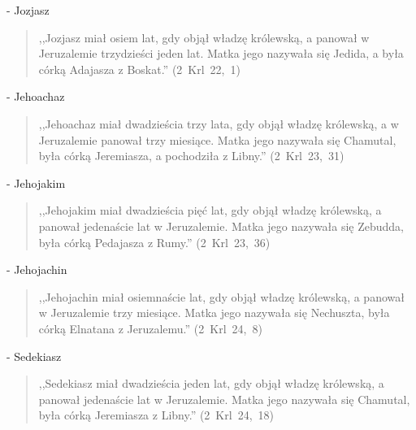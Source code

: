 \documentclass[10pt,a4paper,oneside]{article}
\begin{document}
- Jozjasz
\begin{quote}
,,Jozjasz miał osiem lat, gdy objął władzę królewską, a panował w Jeruzalemie trzydzieści jeden lat. Matka jego nazywała się Jedida, a była córką Adajasza z Boskat.'' \mbox{(2 Krl 22, 1)}
\end{quote}
- Jehoachaz
\begin{quote}
,,Jehoachaz miał dwadzieścia trzy lata, gdy objął władzę królewską, a w Jeruzalemie panował trzy miesiące. Matka jego nazywała się Chamutal, była córką Jeremiasza, a pochodziła z Libny.'' \mbox{(2 Krl 23, 31)}
\end{quote}
- Jehojakim
\begin{quote}
,,Jehojakim miał dwadzieścia pięć lat, gdy objął władzę królewską, a panował jedenaście lat w Jeruzalemie. Matka jego nazywała się Zebudda, była córką Pedajasza z Rumy.'' \mbox{(2 Krl 23, 36)}
\end{quote}
- Jehojachin
\begin{quote}
,,Jehojachin miał osiemnaście lat, gdy objął władzę królewską, a panował w Jeruzalemie trzy miesiące. Matka jego nazywała się Nechuszta, była córką Elnatana z Jeruzalemu.'' \mbox{(2 Krl 24, 8)}
\end{quote}
- Sedekiasz
\begin{quote}
,,Sedekiasz miał dwadzieścia jeden lat, gdy objął władzę królewską, a panował jedenaście lat w Jeruzalemie. Matka jego nazywała się Chamutal, była córką Jeremiasza z Libny.'' \mbox{(2 Krl 24, 18)}
\end{quote}
\end{document}
